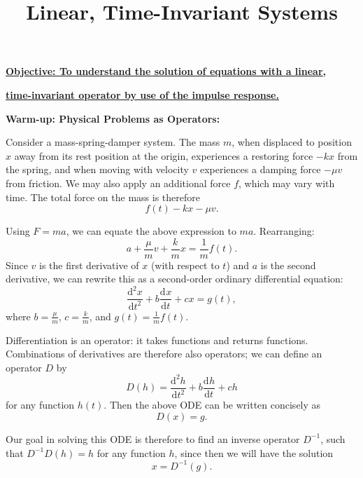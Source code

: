 \documentclass{article}
\newcommand{\deriv}[3][]{\frac{\mathrm{d}^{#1}#2}{\mathrm{d}#3^{#1}}}
\begin{document}
\title{Linear, Time-Invariant Systems}
\date{}

\maketitle
\thispagestyle{empty}

\Large

\vskip -10mm

\textbf{\underline{Objective: To understand the solution of equations with a linear,}}

\textbf{\underline{time-invariant operator by use of the impulse response.}}






\vspace{5mm}












\textbf{Warm-up: Physical Problems as Operators:}

\bigskip


Consider a mass-spring-damper system. The mass $m$, when displaced to position $x$ away from its rest position at the origin, experiences a restoring force $-kx$ from the spring, and when moving with velocity $v$ experiences a damping force $-\mu v$ from friction. We may also apply an additional force $f$, which may vary with time. The total force on the mass is therefore
\[f(t)-kx-\mu v.\]

Using $F=ma$, we can equate the above expression to $ma$. Rearranging:
\[a+\frac{\mu}{m}v+\frac{k}{m}x=\frac{1}{m}f(t).\]
Since $v$ is the first derivative of $x$ (with respect to $t$) and $a$ is the second derivative, we can rewrite this as a second-order ordinary differential equation:
\[\deriv[2]{x}{t}+b\deriv{x}{t}+cx=g(t),\]
where $b=\frac{\mu}{m}$, $c=\frac{k}{m}$, and $g(t)=\frac{1}{m}f(t)$.

Differentiation is an operator: it takes functions and returns functions. Combinations of derivatives are therefore also operators; we can define an operator $D$ by
\[D(h)=\deriv[2]{h}{t}+b\deriv{h}{t}+ch\]
for any function $h(t)$. Then the above ODE can be written concisely as
\[D(x)=g.\]

Our goal in solving this ODE is therefore to find an inverse operator $D^{-1}$, such that $D^{-1}D(h)=h$ for any function $h$, since then we will have the solution
\[x=D^{-1}(g).\]
\end{document}
